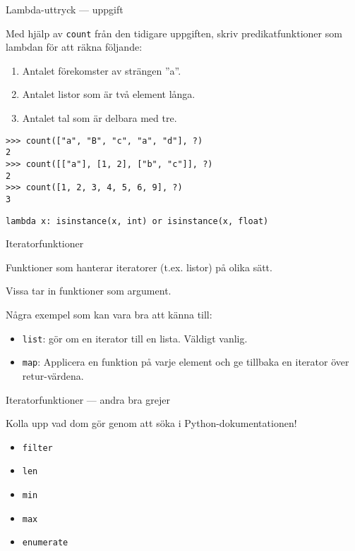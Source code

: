 \documentclass{beamer}
\begin{document}
  \begin{frame}[fragile]{Lambda-uttryck --- uppgift}

    Med hjälp av \texttt{count} från den tidigare uppgiften, skriv
    predikatfunktioner som lambdan för att räkna följande:

    \begin{enumerate}
      \item Antalet förekomster av strängen ''a''.
      \item Antalet listor som är två element långa.
      \item Antalet tal som är delbara med tre.
    \end{enumerate}

    \begin{lstlisting}
>>> count(["a", "B", "c", "a", "d"], ?)
2
>>> count([["a"], [1, 2], ["b", "c"]], ?)
2
>>> count([1, 2, 3, 4, 5, 6, 9], ?)
3
    \end{lstlisting}

    \begin{lstlisting}
lambda x: isinstance(x, int) or isinstance(x, float)
    \end{lstlisting}

  \end{frame}

  \begin{frame}{Iteratorfunktioner}

    Funktioner som hanterar iteratorer (t.ex. listor) på olika sätt.

    Vissa tar in funktioner som argument.

    Några exempel som kan vara bra att känna till:

    \begin{itemize}

      \item \texttt{list}: gör om en iterator till en lista. Väldigt vanlig.

      \item \texttt{map}: Applicera en funktion på varje element och ge tillbaka
      en iterator över retur-värdena.

    \end{itemize}

  \end{frame}

  \begin{frame}{Iteratorfunktioner --- andra bra grejer}

    Kolla upp vad dom gör genom att söka i Python-dokumentationen!

    \begin{itemize}
      \item \texttt{filter}
      \item \texttt{len}
      \item \texttt{min}
      \item \texttt{max}
      \item \texttt{enumerate}
    \end{itemize}

  \end{frame}
\end{document}
